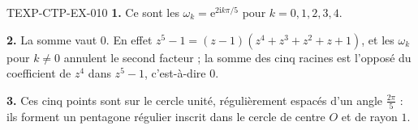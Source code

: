 \begin{corrige}{TEXP-CTP-EX-010}
\textbf{1.} Ce sont les $\omega_k=\mathrm{e}^{2\mathrm{i}k\pi/5}$ pour
$k=0,1,2,3,4$.

\textbf{2.} La somme vaut $0$. En effet
$z^5-1=(z-1)(z^4+z^3+z^2+z+1)$, et les $\omega_k$ pour $k\neq0$ annulent le
second facteur ; la somme des cinq racines est l'opposé du coefficient de
$z^4$ dans $z^5-1$, c'est-à-dire $0$.

\textbf{3.} Ces cinq points sont sur le cercle unité, régulièrement espacés
d'un angle $\tfrac{2\pi}{5}$ : ils forment un pentagone régulier inscrit dans
le cercle de centre $O$ et de rayon $1$.
\end{corrige}

